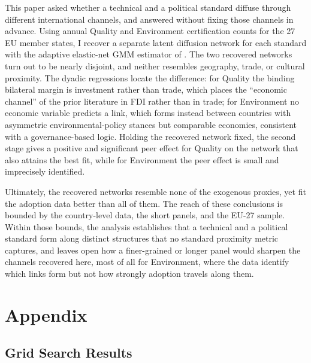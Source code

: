 \documentclass[12pt,a4paper]{article}
\begin{document}
This paper asked whether a technical and a political standard diffuse through different international channels, and answered without fixing those channels in advance. Using annual Quality and Environment certification counts for the 27 EU member states, I recover a separate latent diffusion network for each standard with the adaptive elastic-net GMM estimator of \citet{depaula2025}. The two recovered networks turn out to be nearly disjoint, and neither resembles geography, trade, or cultural proximity. The dyadic regressions locate the difference: for Quality the binding bilateral margin is investment rather than trade, which places the ``economic channel'' of the prior literature in FDI rather than in trade; for Environment no economic variable predicts a link, which forms instead between countries with asymmetric environmental-policy stances but comparable economies, consistent with a governance-based logic. Holding the recovered network fixed, the second stage gives a positive and significant peer effect for Quality on the network that also attains the best fit, while for Environment the peer effect is small and imprecisely identified.

Ultimately, the recovered networks resemble none of the exogenous proxies, yet fit the adoption data better than all of them. The reach of these conclusions is bounded by the country-level data, the short panels, and the EU-27 sample. Within those bounds, the analysis establishes that a technical and a political standard form along distinct structures that no standard proximity metric captures, and leaves open how a finer-grained or longer panel would sharpen the channels recovered here, most of all for Environment, where the data identify which links form but not how strongly adoption travels along them.
\clearpage

\appendix
\section{Appendix}
\renewcommand{\thefigure}{A\arabic{figure}}
\renewcommand{\thetable}{A\arabic{table}}
\setcounter{figure}{0}
\setcounter{table}{0}

\subsection{Grid Search Results}
\end{document}
